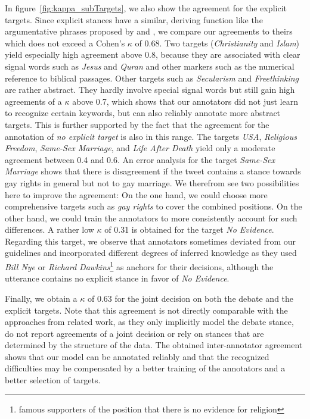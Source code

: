 \documentclass[11pt]{article}
\begin{document}
In figure~\ref{fig:kappa_subTargets}, we also show the agreement for the explicit targets.
Since explicit stances have a similar, deriving function like the argumentative phrases proposed by  and , we compare our agreements to theirs which does not exceed a Cohen's $\kappa$ of 0.68.
Two targets (\textit{Christianity} and \textit{Islam}) yield especially high agreement above $0.8$, because they are associated with clear signal words such as \textit{Jesus} and \textit{Quran} and other markers such as the numerical reference to biblical passages.
Other targets such as \textit{Secularism} and \textit{Freethinking} are rather abstract.
They hardly involve special signal words but still gain high agreements of a $\kappa$ above 0.7, which shows that our annotators did not just learn to recognize certain keywords, but can also reliably annotate more abstract targets.
This is further supported by the fact that the agreement for the annotation of \textit{no explicit target} is also in this range. 
The targets \textit{USA}, \textit{Religious Freedom}, \textit{Same-Sex Marriage}, and \textit{Life After Death} yield only a moderate agreement between 0.4 and 0.6.
An error analysis for the target \textit{Same-Sex Marriage} shows that there is disagreement if the tweet contains a stance towards gay rights in general but not to gay marriage.
We therefrom see two possibilities here to improve the agreement:
On the one hand, we could choose more comprehensive targets such as \textit{gay rights} to cover the combined positions.
On the other hand, we could train the annotators to more consistently account for such differences.
A rather low $\kappa$ of 0.31 is obtained for the target \textit{No Evidence}.
Regarding this target, we observe that annotators sometimes deviated from our guidelines and incorporated different degrees of inferred knowledge as they used \textit{Bill Nye} or \textit{Richard Dawkins}\footnote{famous supporters of the position that there is no evidence for religion} as anchors for their decisions, although the utterance contains no explicit stance in favor of \textit{No Evidence}.

Finally, we obtain a $\kappa$ of 0.63 for the joint decision on both the debate and the explicit targets.
Note that this agreement is not directly comparable with the approaches from related work, as they only implicitly model the debate stance, do not report agreements of a joint decision or rely on stances that are determined by the structure of the data.
The obtained inter-annotator agreement shows that our model can be annotated reliably and that the recognized difficulties may be compensated by a better training of the annotators and a better selection of targets.
   
\end{document}
